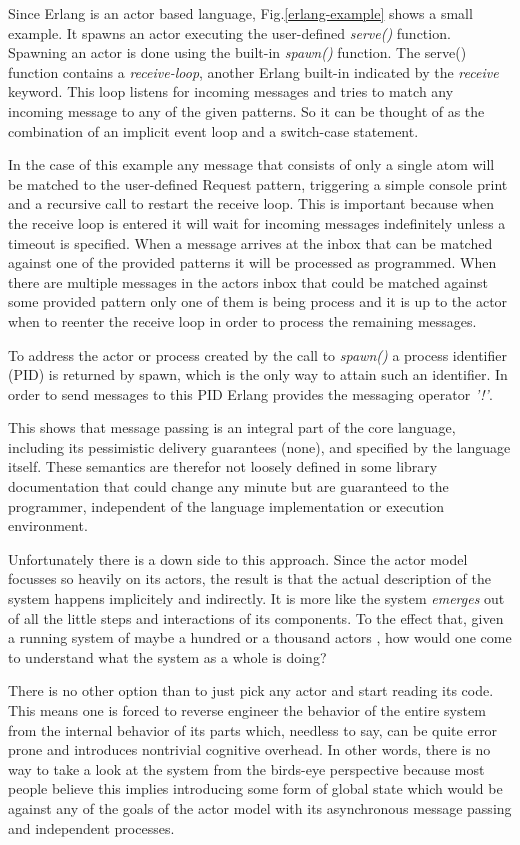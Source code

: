 Since Erlang is an actor based language, Fig.\ref{erlang-example}
shows a small example. It spawns an actor executing the
user-defined \textit{serve()} function. Spawning an actor is done
using the built-in \textit{spawn()} function. The serve() function
contains a \textit{receive-loop}, another Erlang built-in indicated
by the \textit{receive} keyword. This loop listens for incoming
messages and tries to match any incoming message to any of the
given patterns. So it can be thought of as the combination of an
implicit event loop and a switch-case statement.

In the case of this example any message that consists of only a single
atom will be matched to the user-defined Request pattern, triggering
a simple console print and a recursive call to restart the receive
loop. This is important because when the receive loop is entered it
will wait for incoming messages indefinitely unless a timeout is
specified. When a message arrives at the inbox that can be matched
against one of the provided patterns it will be processed as
programmed. When there are multiple messages in the actors inbox
that could be matched against some provided pattern only one
of them is being process and it is up to the actor when to
reenter the receive loop in order to process the remaining messages.

To address the actor or process created by the call to \textit{spawn()}
a process identifier (PID) is returned by spawn, which is the only
way to attain such an identifier. In order to send messages to this
PID Erlang provides the messaging operator \textit{'!'}.

This shows that message passing is an integral part of the core
language, including its pessimistic delivery guarantees (none), and
specified by the language itself. These semantics are therefor
not loosely defined in some library documentation that could
change any minute but are guaranteed to the programmer,
independent of the language implementation or execution environment.
\newline

Unfortunately there is a down side to this approach. Since the
actor model focusses so heavily on its actors, the result is that
the actual description of the system happens implicitely and
indirectly. It is more like the system \textit{emerges} out of all the
little steps and interactions of its components. To the effect that,
given a running system of maybe a hundred or a thousand actors
\cite{uber}, how would one come to understand what the system as
a whole is doing?

There is no other option than to just pick any actor and start
reading its code. This means one is forced to reverse engineer the
behavior of the entire system from the internal behavior of its parts
which, needless to say, can be quite error prone and introduces
nontrivial cognitive overhead. In other words, there is no way to
take a look at the system from the birds-eye perspective because
most people believe this implies introducing some form of global
state which would be against any of the goals of the actor model
with its asynchronous message passing and independent processes.
